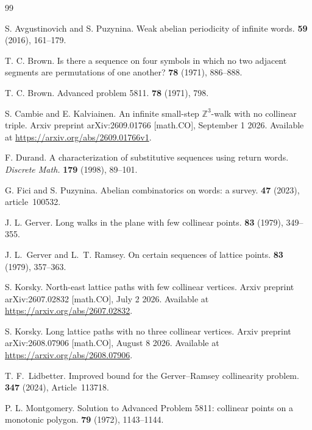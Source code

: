 \documentclass[12pt,reqno]{article}
\newcommand{\Z}{\mathbb Z}
\begin{document}
\begin{thebibliography}{99}

S. Avgustinovich and S. Puzynina.
\newblock Weak abelian periodicity of infinite words.
 \textbf{59} (2016), 161--179.

T. C. Brown.
\newblock Is there a sequence on four symbols in which no two adjacent
segments are permutations of one another?
 {\bf 78} (1971), 886--888.

T. C. Brown.
\newblock Advanced problem 5811.
 {\bf 78} (1971), 798.

S. Cambie and E. Kalviainen.
\newblock An infinite small-step $\Z^3$-walk with no collinear triple.
\newblock Arxiv preprint arXiv:2609.01766 [math.CO],
September 1 2026.  Available at
\url{https://arxiv.org/abs/2609.01766v1}.

F. Durand.
\newblock A characterization of substitutive sequences using return words.
\newblock \emph{Discrete Math.} \textbf{179} (1998), 89--101.

G. Fici and S. Puzynina.
\newblock Abelian combinatorics on words: a survey.
 \textbf{47} (2023), article~100532.

J. L. Gerver.
\newblock Long walks in the plane with few collinear points.
 {\bf 83} (1979), 349--355.

J. L.~Gerver and L.~T. Ramsey.
\newblock On certain sequences of lattice points.
 \textbf{83} (1979), 357--363.

S. Korsky.
\newblock North-east lattice paths with few collinear vertices.
\newblock Arxiv preprint arXiv:2607.02832 [math.CO], July 2 2026.
\newblock Available at \url{https://arxiv.org/abs/2607.02832}.

S. Korsky.
\newblock Long lattice paths with no three collinear vertices.
\newblock Arxiv preprint arXiv:2608.07906 [math.CO], August 8 2026.
\newblock Available at \url{https://arxiv.org/abs/2608.07906}.

T. F.~Lidbetter.
\newblock Improved bound for the Gerver--Ramsey collinearity problem.
 \textbf{347} (2024), Article~113718.

P. L. Montgomery. 
\newblock Solution to Advanced Problem 5811: 
collinear points on a monotonic polygon.
 \textbf{79} (1972), 1143--1144.


\end{thebibliography}
\end{document}
